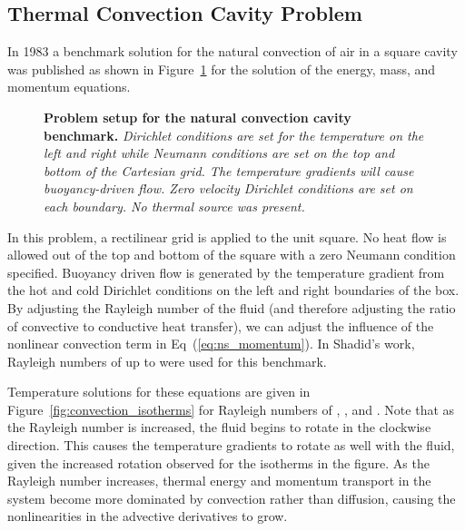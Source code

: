 \subsection{Thermal Convection Cavity Problem}
\label{subsec:natural_convection_cavity}
In 1983 a benchmark solution for the natural convection of air in a
square cavity was published \citep{de_vahl_davis_natural_1983} as
shown in Figure~\ref{fig:natural_convection_cavity} for the solution
of the energy, mass, and momentum equations.

\begin{figure}[t!]
  \begin{center}
    \scalebox{1.5}{
       }
  \end{center}
  \caption{\textbf{Problem setup for the natural convection cavity
      benchmark.} \textit{Dirichlet conditions are set for the
      temperature on the left and right while Neumann conditions are
      set on the top and bottom of the Cartesian grid. The temperature
      gradients will cause buoyancy-driven flow. Zero velocity
      Dirichlet conditions are set on each boundary. No thermal source
      was present.}}
  \label{fig:natural_convection_cavity}
\end{figure}

In this problem, a rectilinear grid is applied to the unit square. No
heat flow is allowed out of the top and bottom of the square with a
zero Neumann condition specified. Buoyancy driven flow is generated by
the temperature gradient from the hot and cold Dirichlet conditions on
the left and right boundaries of the box. By adjusting the Rayleigh
number of the fluid (and therefore adjusting the ratio of convective
to conductive heat transfer), we can adjust the influence of the
nonlinear convection term in Eq~(\ref{eq:ns_momentum}). In Shadid's
work, Rayleigh numbers of up to  were used for this benchmark.

Temperature solutions for these equations are given in
Figure~\ref{fig:convection_isotherms} for Rayleigh numbers of
, ,  and . Note that as the
Rayleigh number is increased, the fluid begins to rotate in the
clockwise direction. This causes the temperature gradients to rotate
as well with the fluid, given the increased rotation observed for the
isotherms in the figure. As the Rayleigh number increases, thermal
energy and momentum transport in the system become more dominated by
convection rather than diffusion, causing the nonlinearities in the
advective derivatives to grow.


